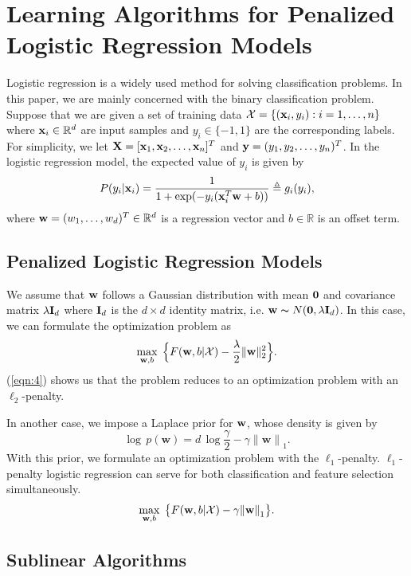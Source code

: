 \documentclass{llncs}
\newcommand{\bw}{\mathbf{w}}
\newcommand{\lc}{\left(}
\newcommand{\rc}{\right)}
\def\I{{\bf I}}
\def\X{{\bf X}}
\def\x{{\bf x}}
\def\y{{\bf y}}
\def\w{{\bf w}}
\def\0{{\bf 0}}
\def\XM{{\mathcal X}}
\def\RB{{\mathbb R}}
\begin{document}
\section{Learning Algorithms for Penalized Logistic Regression Models} \label{sec:plr}

Logistic regression is a widely used method for solving classification problems.
In this paper, we are mainly concerned with the binary classification problem.  	
Suppose that we are given a set of training data $\XM=\{(\x_i, y_i): i=1, \ldots, n\}$ where $\x_i \in \RB^d$ are input samples and $y_i \in \{-1, 1\}$ are the corresponding labels.
For simplicity, we let $\X=[{\x}_{1}, {\x}_{2}, \ldots, {\x}_n]^{T}$ and $\y=(y_1, y_2, \ldots, y_n)^T$.
In the logistic regression model, the expected value of $y_i$ is given by
\[
P(y_i|\x_i)= \frac{1}{1+ \exp(- y_i(\x_i^T \w + b))} \triangleq g_i(y_i),
\]
where $\w=(w_1, \ldots, w_d)^T \in \RB^d$ is a regression vector and $b\in \RB$ is an offset term.

\subsection{Penalized Logistic Regression Models}
	
We assume that $\w$ follows a Gaussian distribution with mean $\0$ and covariance matrix $\lambda \I_d$ where $\I_d$ is the $d{\times}d$ identity matrix, i.e. $\w \thicksim N(\0, \lambda \I_d)$.
In this case, we can formulate the optimization problem as
\begin{equation} \label{eqn:4}
	\max_{\bw ,b} \; \Big\{F(\w, b| \XM) - \frac{\lambda}{2}  \|\bw\|_2^{2} \Big\}.
\end{equation}
(\ref{eqn:4}) shows us that the problem reduces to an optimization problem with an $\ell_2$-penalty.
	
In another case, we impose a Laplace prior for $\w$, whose density is given by
\[	
\log\,p\lc\bw \rc=d\,\log\frac{\gamma}{2}-\gamma{\|\bw\|}_{1}.
\]
With this prior, we formulate an optimization problem with the $\ell_1$-penalty. $\ell_1$-penalty logistic regression can serve for both classification and feature selection simultaneously.
\begin{equation} \label{eqn:5}
	\max_{\bw ,b} \;  \big\{F(\w, b|\XM)- \gamma{\|\bw \|}_{1}\big\}.	
\end{equation}

\subsection{Sublinear Algorithms}
\end{document}
